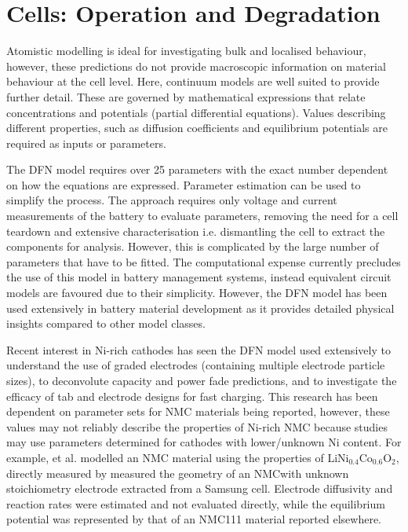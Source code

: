 \documentclass[journal=jacsat,manuscript=article]{achemso}
\begin{document}
\section*{Cells: Operation and Degradation}
Atomistic modelling is ideal for investigating bulk and localised behaviour, however, these predictions do not provide macroscopic information on material behaviour at the cell level. 
Here, continuum models are well suited to provide further detail. 
These are governed by mathematical expressions that relate concentrations and potentials (partial differential equations). 
Values describing different properties, such as diffusion coefficients and equilibrium potentials are required as inputs or parameters.

The DFN model requires over 25 parameters with the exact number dependent on how the equations are expressed.\cite{Kim2011} 
Parameter estimation can be used to simplify the process. 
The approach requires only voltage and current measurements of the battery to evaluate parameters, removing the need for a cell teardown and extensive characterisation i.e. dismantling the cell to extract the components for analysis. \cite{Jin2018} 
However, this is complicated by the large number of parameters that have to be fitted.
The computational expense currently precludes the use of this model in battery management systems, instead equivalent circuit models are favoured due to their simplicity.\cite{Marquis2019} 
However, the DFN model has been used extensively in battery material development as it provides detailed physical insights compared to other model classes.\cite{Dawson2018}

Recent interest in Ni-rich cathodes has seen the DFN model used extensively to understand the use of graded electrodes (containing multiple electrode particle sizes), to deconvolute capacity and power fade predictions, and to investigate the efficacy of tab and electrode designs for fast charging.\cite{Richardson2020,Kindermann2017,Sturm2019} 
This research has been dependent on parameter sets for NMC materials being reported, however, these values may not reliably describe the properties of Ni-rich NMC because studies may use parameters determined for cathodes with lower/unknown Ni content. 
For example, \citeauthor{Richardson2020} et al. modelled an NMC material using the properties of LiNi$_{0.4}$Co$_{0.6}$O$_2$, directly measured by \citeauthor{Ecker2015}\cite{Richardson2020,Ecker2015} \citeauthor{Kindermann2017} measured the geometry of an NMC\textendash with unknown stoichiometry  \textendash electrode extracted from a Samsung cell.\cite{Kindermann2017} 
Electrode diffusivity and reaction rates were estimated and not evaluated directly, while the equilibrium potential was represented by that of an NMC111 material reported elsewhere.\cite{Stewart_2008} 
\end{document}
